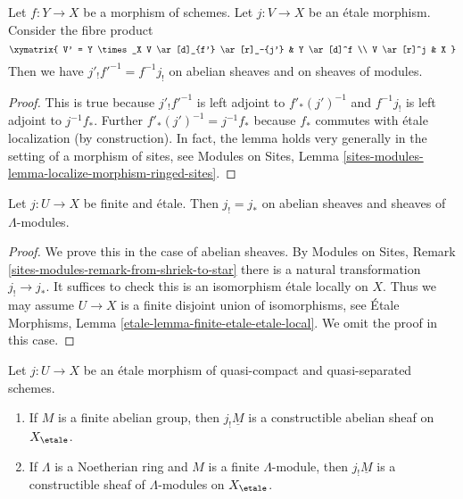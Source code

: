 \begin{lemma}
\label{lemma-shriek-base-change}
Let $f: Y \to X$ be a morphism of schemes. Let $j: V \to X$ be an \'etale
morphism. Consider the fibre product
$$
\xymatrix{
V' = Y \times_X V \ar[d]_{f'} \ar[r]_-{j'} & Y \ar[d]^f \\
V \ar[r]^j & X
}
$$
Then we have $j'_! f'^{-1} = f^{-1} j_!$ on abelian sheaves and on
sheaves of modules.
\end{lemma}

\begin{proof}
This is true because $j'_! f'^{-1}$ is left adjoint to
$f'_* (j')^{-1}$ and $f^{-1} j_!$ is left adjoint to $j^{-1}f_*$.
Further $f'_* (j')^{-1} = j^{-1}f_*$ because $f_*$ commutes with
\'etale localization (by construction). In fact, the lemma holds very generally
in the setting of a morphism of sites, see
Modules on Sites, Lemma
\ref{sites-modules-lemma-localize-morphism-ringed-sites}.
\end{proof}

\begin{lemma}
\label{lemma-shriek-equals-star-finite-etale}
Let $j : U \to X$ be finite and \'etale. Then $j_! = j_*$
on abelian sheaves and sheaves of $\Lambda$-modules.
\end{lemma}

\begin{proof}
We prove this in the case of abelian sheaves.
By Modules on Sites, Remark \ref{sites-modules-remark-from-shriek-to-star}
there is a natural transformation $j_! \to j_*$.
It suffices to check this is an isomorphism \'etale locally
on $X$. Thus we may assume $U \to X$ is a finite disjoint union
of isomorphisms, see
\'Etale Morphisms, Lemma \ref{etale-lemma-finite-etale-etale-local}.
We omit the proof in this case.
\end{proof}

\begin{lemma}
\label{lemma-jshriek-constructible}
Let $j : U \to X$ be an \'etale morphism of quasi-compact and
quasi-separated schemes.
\begin{enumerate}
\item If $M$ is a finite abelian group, then $j_!\underline{M}$ is a
constructible abelian sheaf on $X_\etale$.
\item If $\Lambda$ is a Noetherian ring and $M$ is a finite $\Lambda$-module,
then $j_!\underline{M}$ is a constructible sheaf of $\Lambda$-modules
on $X_\etale$.
\end{enumerate}
\end{lemma}

